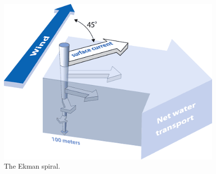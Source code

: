 \begin{figure}
\includegraphics[width=\linewidth]{images/ekman_spiral.png}
\caption{The Ekman spiral.}
\label{fig:ekman}
\end{figure}
